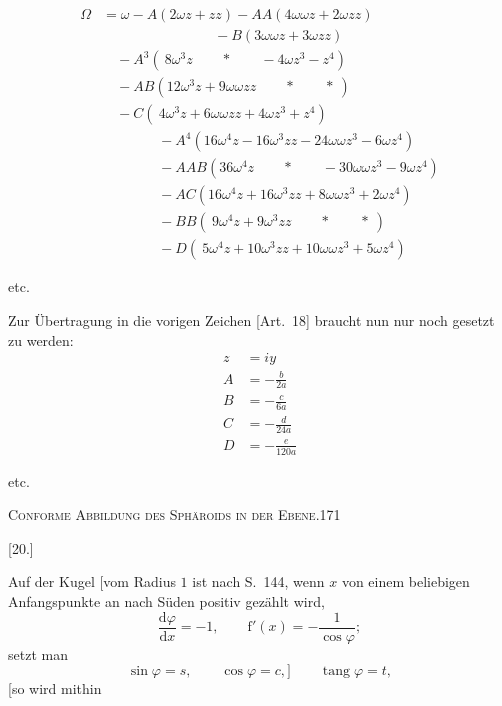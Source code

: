 \[
\begin{aligned}
\Omega&=\omega-A(2\omega z+zz)-AA(4\omega\omega z+2\omega zz)\\
&\qquad\qquad\qquad\qquad-B(3\omega\omega z+3\omega zz)\\[5pt]
&\quad-A^3(\ 8\omega^3z\qquad\ast\qquad-4\omega z^3-z^4)\\
&\quad-AB(12\omega^3z+9\omega\omega zz\qquad\ast\qquad\ast\ )\\
&\quad-C(\ 4\omega^3z+6\omega\omega zz+4\omega z^3+z^4)\\[5pt]
&\qquad\qquad-A^4(16\omega^4z-16\omega^3zz-24\omega\omega z^3-6\omega z^4)\\
&\qquad\qquad-AAB(36\omega^4z\qquad\ast\qquad-30\omega\omega z^3-9\omega z^4)\\
&\qquad\qquad-AC(16\omega^4z+16\omega^3zz+8\omega\omega z^3+2\omega z^4)\\
&\qquad\qquad-BB(\ 9\omega^4z+9\omega^3zz\qquad\ast\qquad\ast\ )\\
&\qquad\qquad-D(\ 5\omega^4z+10\omega^3zz+10\omega\omega z^3+5\omega z^4)
\end{aligned}
\]
\begin{center}etc.\end{center}
\par\endgroup
Zur Übertragung in die vorigen Zeichen [Art.~18] braucht nun nur noch gesetzt zu werden:
\[
\begin{aligned}
z&=iy\\[5pt]
A&=-\frac b{2a}\\[5pt]
B&=-\frac c{6a}\\[5pt]
C&=-\frac d{24a}\\[5pt]
D&=-\frac e{120a}
\end{aligned}
\]
\begin{center}etc.\end{center}
\clearpage
\noindent\mbox{}\hfill\textsc{Conforme Abbildung des Sphäroids in der Ebene.}\hfill171\par\medskip
\begin{center}[20.]\end{center}
Auf der Kugel [vom Radius $1$ ist nach S.~144, wenn $x$ von einem beliebigen Anfangspunkte an nach Süden positiv gezählt wird,
\[
\frac{\mathrm d\varphi}{\mathrm dx}=-1,\qquad\mathrm f'(x)=-\frac1{\cos\varphi};
\]
setzt man
\[
\sin\varphi=s,\qquad\cos\varphi=c,]\qquad\operatorname{tang}\varphi=t,
\]
[so wird mithin
\begingroup\small
